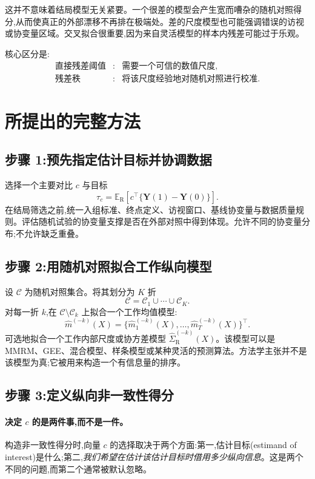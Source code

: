 \documentclass[11pt]{article}
\newcommand{\R}{\mathrm{R}}
\newcommand{\Exp}{\mathbb{E}}
\begin{document}
这并不意味着结局模型无关紧要。一个很差的模型会产生宽而嘈杂的随机对照得分,从而使真正的外部漂移不再排在极端处。差的尺度模型也可能强调错误的访视或协变量区域。交叉拟合很重要,因为来自灵活模型的样本内残差可能过于乐观。

核心区分是:
\[
\begin{array}{ccl}
\text{直接残差阈值} &:& \text{需要一个可信的数值尺度},\\
\text{残差秩} &:& \text{将该尺度经验地对随机对照进行校准}.
\end{array}
\]

\section{所提出的完整方法}

\subsection{步骤 1:预先指定估计目标并协调数据}

选择一个主要对比 $c$ 与目标
\[
\tau_c=\Exp_{\R}\!\left[c^{\top}\{\bm Y(1)-\bm Y(0)\}\right].
\]
在结局筛选之前,统一入组标准、终点定义、访视窗口、基线协变量与数据质量规则。评估随机试验的协变量支撑是否在外部对照中得到体现。允许不同的协变量分布;不允许缺乏重叠。

\subsection{步骤 2:用随机对照拟合工作纵向模型}

设 $\mathcal C$ 为随机对照集合。将其划分为 $K$ 折
\[
\mathcal C=\mathcal C_1\cup\cdots\cup\mathcal C_K.
\]
对每一折 $k$,在 $\mathcal C\setminus\mathcal C_k$ 上拟合一个工作均值模型:
\[
\widehat m^{(-k)}(X)
=
\{\widehat m^{(-k)}_1(X),\ldots,\widehat m^{(-k)}_T(X)\}^{\top}.
\]
可选地拟合一个工作内部尺度或协方差模型 $\widehat\Sigma_{\R}^{(-k)}(X)$。该模型可以是 MMRM、GEE、混合模型、样条模型或某种灵活的预测算法。方法学主张并不是该模型为真;它被用来构造一个有信息量的排序。

\subsection{步骤 3:定义纵向非一致性得分}

\paragraph{决定 $c$ 的是两件事,而不是一件。}
构造非一致性得分时,向量 $c$ 的选择取决于两个方面:第一,估计目标(estimand of interest)是什么;第二,\emph{我们希望在估计该估计目标时借用多少纵向信息}。这是两个不同的问题,而第二个通常被默认忽略。
\end{document}
